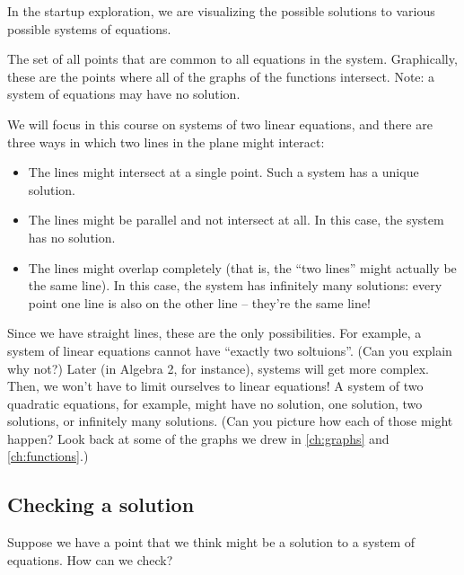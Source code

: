 
In the startup exploration, we are visualizing the possible solutions to various possible systems of equations.

\begin{boxdef}
The set of all points that are common to all equations in the system. Graphically, these are the points where all of the graphs of the functions intersect. Note: a system of equations may have no solution.
\end{boxdef}

We will focus in this course on systems of two linear equations, and there are three ways in which two lines in the plane might interact:
\begin{itemize}
\item The lines might intersect at a single point. Such a system has a unique solution.

\item The lines might be parallel and not intersect at all. In this case, the system has no solution.

\item The lines might overlap completely (that is, the ``two lines'' might actually be the same line). In this case, the system has infinitely many solutions: every point one line is also on the other line -- they're the same line!
\end{itemize}

Since we have straight lines, these are the only possibilities. For example, a system of linear equations cannot have ``exactly two soltuions''. (Can you explain why not?) Later (in Algebra 2, for instance), systems will get more complex. Then, we won't have to limit ourselves to linear equations! A system of two quadratic equations, for example, might have no solution, one solution, two solutions, or infinitely many solutions. (Can you picture how each of those might happen? Look back at some of the graphs we drew in \cref{ch:graphs} and \cref{ch:functions}.)


\subsection{Checking a solution}

Suppose we have a point that we think might be a solution to a system of equations. How can we check?

